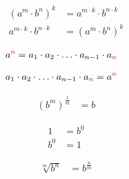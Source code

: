 \begin{arule}
\begin{subequations}
\begin{align}
	\left(a^m \cdot b^n\right)^k &= a^{m \cdot k} \cdot b^{n\cdot k} \label{eq:poprpo1}\\
	a^{m \cdot k} \cdot b^{n \cdot k} &= \left(a^m \cdot b^n\right)^k \label{eq:poprpo2}
\end{align}
\end{subequations}
\end{arule}

\begin{definition}
\begin{align}
a^{\alert{n}} &= a_1 \cdot a_2 \cdot \ldots \cdot a_{n-1} \cdot a_{\alert{n}} \label{eq:potf} 
\end{align}
\end{definition}

\begin{definition}
\begin{align}
a_1 \cdot a_2 \cdot \ldots \cdot a_{n-1} \cdot a_{\alert{n}} &= a^{\alert{n}} \label{eq:ftpo} 
\end{align}
\end{definition}

\begin{definition}
\begin{subequations}
\begin{align}
\left(b^{m}\right)^{\frac{1}{m}} &= b  \label{eq:poi} 
\end{align}
\end{subequations}
\end{definition}

\begin{definition}
\begin{subequations}
\begin{align}
1&= b^0  \label{eq:poid1} \\
b^{0}&= 1  \label{eq:poid2} 
\end{align}
\end{subequations}
\end{definition}

\begin{notation}
\begin{align}
\sqrt[m]{b^n} &= b^{\frac{n}{m}}	 \label{eq:rtpo} 
\end{align}
\end{notation}

